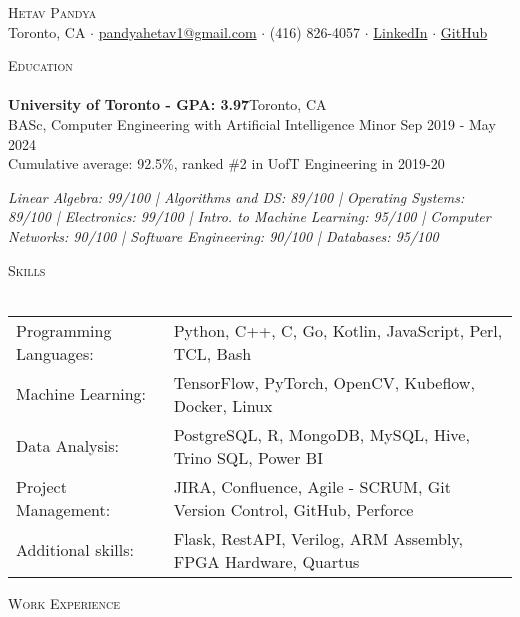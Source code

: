 \documentclass[a4paper]{article}
\newcommand{\lineunder} {
    \vspace*{-8pt} \\
    \hspace*{-18pt} \hrulefill \\
}
\newcommand{\header} [1] {
    {\hspace*{-18pt}\vspace*{6pt} \textsc{#1}}
    \vspace*{-6pt} \lineunder
}
\begin{document}
\vspace*{-40pt}



\vspace*{-10pt}
\begin{center}
	{\Huge \scshape {Hetav Pandya}}\\
	Toronto, CA $\cdot$ \href{mailto:pandyahetav1@gmail.com}{pandyahetav1@gmail.com} $\cdot$ (416) 826-4057 $\cdot$ \href{https://www.linkedin.com/in/hetav-pandya}{LinkedIn} $\cdot$ \href{https://github.com/pandyah5}{GitHub}\\
\end{center}

\header{Education}
\textbf{University of Toronto - GPA: 3.97}\hfill Toronto, CA\\
BASc, Computer Engineering with Artificial Intelligence Minor \hfill Sep 2019 - May 2024\\
Cumulative average: 92.5\%, ranked \#2 in UofT Engineering in 2019-20
\linebreak\\
\begin{footnotesize}
\textit{Linear Algebra: 99/100 | Algorithms and DS: 89/100 | Operating Systems: 89/100 | Electronics: 99/100 | 
 Intro. to Machine Learning: 95/100 | Computer Networks: 90/100 | Software Engineering: 90/100 | Databases: 95/100}
\end{footnotesize}
\vspace{2mm}

\header{Skills}
\begin{tabular}{ l l }
	Programming Languages: & Python, C++, C, Go, Kotlin, JavaScript, Perl, TCL, Bash             \\
	Machine Learning:      & TensorFlow, PyTorch, OpenCV, Kubeflow, Docker, Linux             \\
	Data Analysis:         & PostgreSQL, R, MongoDB, MySQL, Hive, Trino SQL, Power BI            \\
	Project Management:    & JIRA, Confluence, Agile - SCRUM, Git Version Control, GitHub, Perforce           \\
    Additional skills:     & Flask, RestAPI, Verilog, ARM Assembly, FPGA Hardware, Quartus                      \\                               
\end{tabular}
\vspace{2mm}

\header{Work Experience}
\vspace{1mm}
\end{document}

